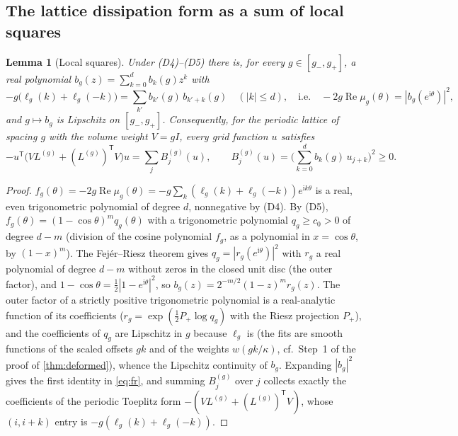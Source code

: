 \documentclass[11pt,a4paper]{article}
\theoremstyle{plain}
\newtheorem{lemma}[theorem]{Lemma}
\theoremstyle{definition}
\theoremstyle{remark}
\numberwithin{equation}{section}
\renewcommand{\Re}{\operatorname{Re}}
\newcommand{\ii}{\mathrm{i}}
\begin{document}
\subsection{The lattice dissipation form as a sum of local squares}

\begin{lemma}[Local squares]\label{lem:fr}
Under (D4)--(D5) there is, for every $g\in[g_-,g_+]$, a real polynomial $b_g(z)=\sum_{k=0}^db_k(g)z^k$ with
\begin{equation}\label{eq:fr}
-g\big(\ell_g(k)+\ell_g(-k)\big)=\sum_{k'}b_{k'}(g)\,b_{k'+k}(g)\quad(|k|\le d),
\quad\text{i.e.}\quad -2g\Re\mu_g(\theta)=|b_g(e^{\ii\theta})|^2 ,
\end{equation}
and $g\mapsto b_g$ is Lipschitz on $[g_-,g_+]$. Consequently, for the periodic lattice of spacing $g$ with the volume weight $V=gI$, every grid function $u$ satisfies
\begin{equation}\label{eq:squares}
-u^{\mathsf T}\big(VL^{(g)}+(L^{(g)})^{\mathsf T}V\big)u=\sum_jB^{(g)}_j(u),\qquad B^{(g)}_j(u)=\Big(\sum_{k=0}^db_k(g)\,u_{j+k}\Big)^2\ge0 .
\end{equation}
\end{lemma}

\begin{proof}
$f_g(\theta)=-2g\Re\mu_g(\theta)=-g\sum_k(\ell_g(k)+\ell_g(-k))e^{\ii k\theta}$ is a real, even trigonometric polynomial of degree $d$, nonnegative by (D4). By (D5), $f_g(\theta)=(1-\cos\theta)^mq_g(\theta)$ with a trigonometric polynomial $q_g\ge c_0>0$ of degree $d-m$ (division of the cosine polynomial $f_g$, as a polynomial in $x=\cos\theta$, by $(1-x)^m$). The Fej\'er--Riesz theorem \cite[Sec.~1.12]{GrenanderSzego1958} gives $q_g=|r_g(e^{\ii\theta})|^2$ with $r_g$ a real polynomial of degree $d-m$ without zeros in the closed unit disc (the outer factor), and $1-\cos\theta=\frac12|1-e^{\ii\theta}|^2$, so $b_g(z)=2^{-m/2}(1-z)^mr_g(z)$. The outer factor of a strictly positive trigonometric polynomial is a real-analytic function of its coefficients ($r_g=\exp(\frac12P_+\log q_g)$ with the Riesz projection $P_+$), and the coefficients of $q_g$ are Lipschitz in $g$ because $\ell_g$ is (the fits are smooth functions of the scaled offsets $gk$ and of the weights $w(gk/\kappa)$, cf.\ Step~1 of the proof of \cref{thm:deformed}), whence the Lipschitz continuity of $b_g$. Expanding $|b_g|^2$ gives the first identity in \eqref{eq:fr}, and summing $B_j^{(g)}$ over $j$ collects exactly the coefficients of the periodic Toeplitz form $-(VL^{(g)}+(L^{(g)})^{\mathsf T}V)$, whose $(i,i+k)$ entry is $-g(\ell_g(k)+\ell_g(-k))$.
\end{proof}
\end{document}
